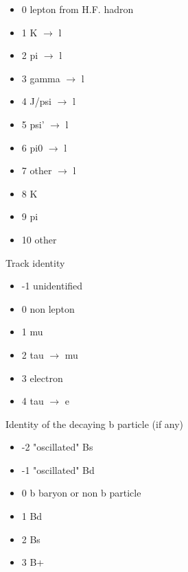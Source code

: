 \begin{indentlist}{ 3.50cm}{ 3.75cm}
\begin{itemize}
\item                          0   lepton from H.F. hadron
\item                          1   K $\rightarrow$ l
\item                          2   pi $\rightarrow$ l
\item                          3   gamma $\rightarrow$ l
\item                          4   J/psi $\rightarrow$ l
\item                          5   psi' $\rightarrow$ l
\item                          6   pi0 $\rightarrow$ l
\item                          7   other $\rightarrow$ l
\item                          8   K
\item                          9   pi
\item                         10   other
\end{itemize}
    Track identity
 
\begin{itemize}
\item                         -1   unidentified
\item                          0   non lepton
\item                          1   mu
\item                          2   tau $\rightarrow$ mu
\item                          3   electron
\item                          4   tau $\rightarrow$ e
\end{itemize}
   Identity of the decaying b particle (if any)
 
\begin{itemize}
\item                         -2   "oscillated" Bs
\item                         -1   "oscillated" Bd
\item                          0   b baryon or non b particle
\item                          1   Bd
\item                          2   Bs
\item                          3   B+
\end{itemize}
\end{indentlist}
 
